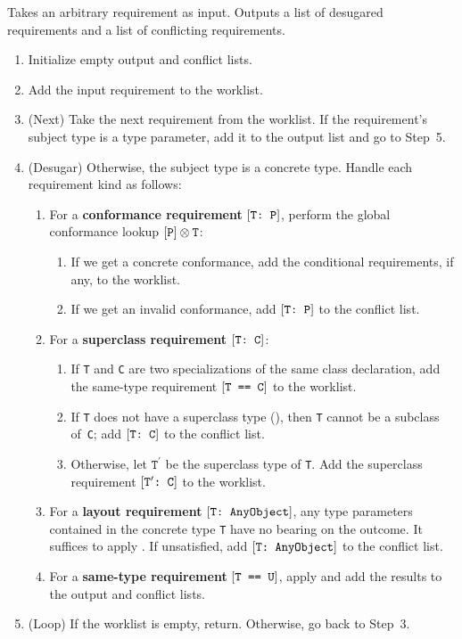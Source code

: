 \documentclass[../generics]{subfiles}
\begin{document}
\begin{algorithm}\label{requirement desugaring algorithm}
Takes an arbitrary requirement as input. Outputs a list of desugared requirements and a list of conflicting requirements.
\begin{enumerate}
\item Initialize empty output and conflict lists.
\item Add the input requirement to the worklist.
\item (Next) Take the next requirement from the worklist. If the requirement's subject type is a type parameter, add it to the output list and go to Step~5.
\item (Desugar) Otherwise, the subject type is a concrete type. Handle each requirement kind as follows:
\begin{enumerate}
\item For a \textbf{conformance requirement} $[\texttt{T:~P}]$, perform the global conformance lookup $[\texttt{P}]\otimes\texttt{T}$:
\begin{enumerate}
\item If we get a concrete conformance, add the conditional requirements, if any, to the worklist.
\item If we get an invalid conformance, add $[\texttt{T:~P}]$ to the conflict list.
\end{enumerate}
\item For a \textbf{superclass requirement} $[\texttt{T:~C}]$:
\begin{enumerate}
\item If \texttt{T} and \texttt{C} are two specializations of the same class declaration, add the same-type requirement $[\texttt{T == C}]$ to the worklist.
\item If \texttt{T} does not have a superclass type (), then \texttt{T} cannot be a subclass of~\texttt{C}; add $[\texttt{T:~C}]$ to the conflict list.
\item Otherwise, let $\texttt{T}^\prime$ be the superclass type of \texttt{T}. Add the superclass requirement $[\texttt{$\texttt{T}^\prime$:~C}]$ to the worklist.
\end{enumerate}
\item For a \textbf{layout requirement} $[\texttt{T:~AnyObject}]$, any type parameters contained in the concrete type \texttt{T} have no bearing on the outcome. It suffices to apply . If unsatisfied, add $[\texttt{T:~AnyObject}]$ to the conflict list.
\item For a \textbf{same-type requirement} $[\texttt{T == U}]$, apply  and add the results to the output and conflict lists.
\end{enumerate}
\item (Loop) If the worklist is empty, return. Otherwise, go back to Step~3.
\end{enumerate}
\end{algorithm}
\end{document}
